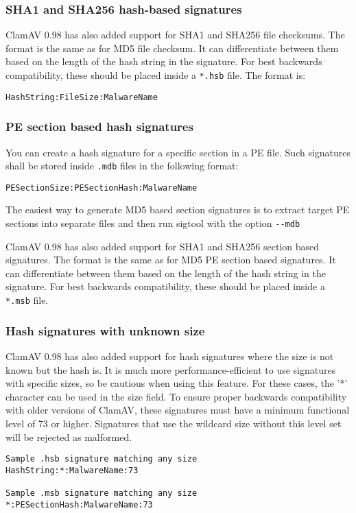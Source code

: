 \documentclass[a4paper,titlepage,12pt]{article}
\begin{document}
    \subsubsection{SHA1 and SHA256 hash-based signatures}
    ClamAV 0.98 has also added support for SHA1 and SHA256 file checksums.
    The format is the same as for MD5 file checksum.
    It can differentiate between them based on the length of the hash string
    in the signature. For best backwards compatibility, these should be
    placed inside a \verb+*.hsb+ file. The format is:
    \begin{verbatim}
HashString:FileSize:MalwareName
    \end{verbatim}

    \subsubsection{PE section based hash signatures}
    You can create a hash signature for a specific section in a PE file.
    Such signatures shall be stored inside \verb+.mdb+ files in the
    following format:
    \begin{verbatim}
PESectionSize:PESectionHash:MalwareName
    \end{verbatim}
    The easiest way to generate MD5 based section signatures is to extract
    target PE sections into separate files and then run sigtool with the
    option \verb+--mdb+

    ClamAV 0.98 has also added support for SHA1 and SHA256 section based
    signatures. The format is the same as for MD5 PE section based signatures.
    It can differentiate between them based on the length of the hash string
    in the signature. For best backwards compatibility, these should be
    placed inside a \verb+*.msb+ file.

    \subsubsection{Hash signatures with unknown size}
    ClamAV 0.98 has also added support for hash signatures where the size
    is not known but the hash is. It is much more performance-efficient to
    use signatures with specific sizes, so be cautious when using this
    feature. For these cases, the '*' character can be used in the size
    field. To ensure proper backwards compatibility with older versions of
    ClamAV, these signatures must have a minimum functional level of 73 or
    higher. Signatures that use the wildcard size without this level set
    will be rejected as malformed.
    \begin{verbatim}
Sample .hsb signature matching any size
HashString:*:MalwareName:73

Sample .msb signature matching any size
*:PESectionHash:MalwareName:73
    \end{verbatim}
\end{document}
